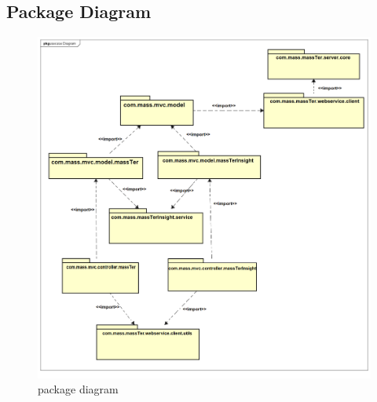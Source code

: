 	\subsection{Package Diagram}
		\begin{figure}[h]
		\centering
		\includegraphics[width=1\textwidth]{packageDiagram.png}
		\caption{package diagram}
	\end{figure}
  
	\pagebreak
	\clearpage
	\newpage
